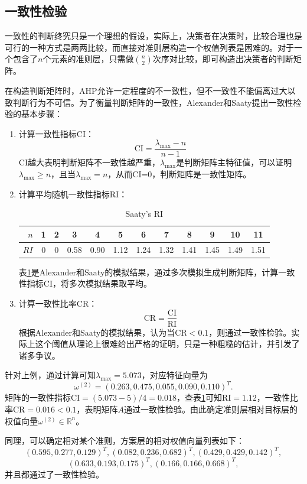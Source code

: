 \subsection{一致性检验}
一致性的判断终究只是一个理想的假设，实际上，决策者在决策时，比较合理也是可行的一种方式是两两比较，而直接对准则层构造一个权值列表是困难的。对于一个包含了$n$个元素的准则层，只需做$\binom{n}{2}$次序对比较，即可构造出决策者的判断矩阵。

在构造判断矩阵时，AHP允许一定程度的不一致性，但不一致性不能偏离过大以致判断行为不可信。为了衡量判断矩阵的一致性，Alexander和Saaty提出一致性检验的基本步骤\cite{alexander1977forward}：
\begin{enumerate}[（I）]
\item 计算一致性指标CI：
\[
    \textrm{CI} = \frac{\lambda_{\max}-n}{n-1}
\]
CI越大表明判断矩阵不一致性越严重，$\lambda_{\max}$是判断矩阵主特征值，可以证明$\lambda_{\max}\ge n$，且当$\lambda_{\max}=n$，从而CI=0，判断矩阵是一致性矩阵。

\item 计算平均随机一致性指标RI：
\begin{table}[ht]
\caption{Saaty's RI}\label{tbl:ri}
\centering
\begin{tabular}{r|ccccccccccc}
\hline
$n$ & 1 & 2 & 3 & 4 & 5 & 6 & 7 & 8 & 9 & 10 & 11\\
\hline
$RI$ & 0 & 0 & 0.58 & 0.90 & 1.12 & 1.24 & 1.32 & 1.41 & 1.45 & 1.49 & 1.51\\
\hline
\end{tabular}
\end{table}
表\ref{tbl:ri}是Alexander和Saaty的模拟结果，通过多次模拟生成判断矩阵，计算一致性指标CI，将多次模拟结果取平均。

\item 计算一致性比率CR：
\[
    \text{CR} = \frac{\text{CI}}{\text{RI}}
\]
根据Alexander和Saaty的模拟结果，认为当$\text{CR}<0.1$，则通过一致性检验。实际上这个阈值从理论上很难给出严格的证明，只是一种粗糙的估计，并引发了诸多争议。
\end{enumerate}

针对上例，通过计算可知$\lambda_{\max}=5.073$，对应特征向量为
\[
\omega^{(2)}=(0.263,0.475,0.055,0.090,0.110)^T.
\]
矩阵的一致性指标$\text{CI}=(5.073-5)/4=0.018$，查表\ref{tbl:ri}可知$\text{RI}=1.12$，一致性比率$\text{CR}=0.016<0.1$，表明矩阵$A$通过一致性检验。由此确定准则层相对目标层的权值向量$\omega^{(2)}\in \mathbb R^n$。

同理，可以确定相对某个准则，方案层的相对权值向量列表如下：
\[
    (0.595,0.277,0.129)^T,(0.082,0.236,0.682)^T,(0.429,0.429,0.142)^T,
\]
\[
    (0.633,0.193,0.175)^T,(0.166,0.166,0.668)^T,
\]
并且都通过了一致性检验。

